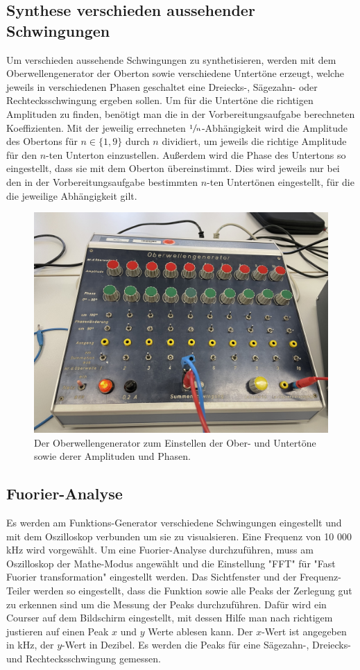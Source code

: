 \subsection{Synthese verschieden aussehender Schwingungen}
Um verschieden aussehende Schwingungen zu synthetisieren, werden mit dem Oberwellengenerator der Oberton sowie verschiedene
Untertöne erzeugt, welche jeweils in verschiedenen Phasen geschaltet eine Dreiecks-, Sägezahn- oder Rechtecksschwingung
ergeben sollen. Um für die Untertöne die richtigen Amplituden zu finden, benötigt man die in der Vorbereitungsaufgabe berechneten 
Koeffizienten. Mit der jeweilig errechneten $\sfrac{1}{n}$-Abhängigkeit wird die Amplitude des Obertons für $n\in\{1,9\}$ durch $n$ dividiert, um 
jeweils die richtige Amplitude für den $n$-ten Unterton einzustellen. Außerdem wird die Phase des Untertons so eingestellt, dass sie mit
dem Oberton übereinstimmt. Dies wird jeweils nur bei den in der Vorbereitungsaufgabe bestimmten $n$-ten 
Untertönen eingestellt, für die die jeweilige Abhängigkeit gilt.
\begin{figure}
    \includegraphics[width=\textwidth]{Messdaten_Bilder/Oberwellengenerator.jpeg}
    \caption{Der Oberwellengenerator zum Einstellen der Ober- und Untertöne sowie derer Amplituden und Phasen.}
    \label{fig:Oberwelle}
\end{figure}
\subsection{Fuorier-Analyse}
Es werden am Funktions-Generator verschiedene Schwingungen eingestellt und mit dem Oszilloskop verbunden um sie zu 
visualsieren. Eine Frequenz von 10 000\,kHz wird vorgewählt. Um eine Fuorier-Analyse durchzuführen, muss am Oszilloskop
der Mathe-Modus angewählt und die Einstellung "FFT" für "Fast Fuorier transformation" eingestellt werden. Das Sichtfenster 
und der Frequenz-Teiler werden so eingestellt, dass die Funktion sowie alle Peaks der Zerlegung gut zu erkennen sind um die Messung der Peaks
durchzuführen. Dafür wird ein Courser auf dem Bildschirm eingestellt, mit dessen Hilfe man nach richtigem justieren auf einen Peak
$x$ und $y$ Werte ablesen kann. Der $x$-Wert ist angegeben in kHz, der $y$-Wert in Dezibel. Es werden die Peaks für eine Sägezahn-,
Dreiecks- und Rechtecksschwingung gemessen.  